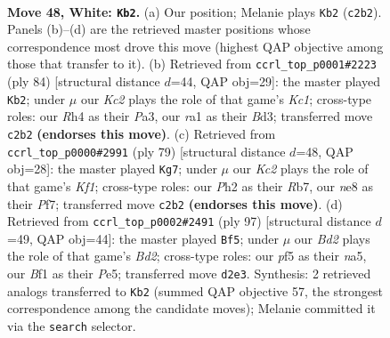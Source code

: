 \documentclass[11pt]{article}
\begin{document}
\clearpage

\begin{figure}[p]\centering
\begin{subfigure}{0.46\textwidth}\centering
\resizebox{\linewidth}{!}{%
\newchessgame
\chessboard[
  setfen={4n3/p1p5/2k5/5p2/r4P1R/8/2KB3P/r4BR1 w - - 0 48},
  showmover=false,
  pgfstyle=straightmove, color=movearrow, markmove={c2-b2}
]}
\caption{}
\end{subfigure}\hfill
\begin{subfigure}{0.46\textwidth}\centering
\resizebox{\linewidth}{!}{%
\newchessgame
\chessboard[
  setfen={2r5/8/p3pk1P/1pr5/7R/P2B1P2/2P5/2K5 w - - 2 43},
  showmover=false,
  pgfstyle=straightmove, color=movearrow, markmove={c1-b2}
]}
\caption{}
\end{subfigure}
\\[4pt]
\begin{subfigure}{0.46\textwidth}\centering
\resizebox{\linewidth}{!}{%
\newchessgame
\chessboard[
  setfen={5k2/1r1b1p2/r7/3N4/p2RP3/R3KP2/8/8 b - - 16 40},
  showmover=false,
  pgfstyle=straightmove, color=movearrow, markmove={f8-g7}
]}
\caption{}
\end{subfigure}\hfill
\begin{subfigure}{0.46\textwidth}\centering
\resizebox{\linewidth}{!}{%
\newchessgame
\chessboard[
  setfen={8/3brpk1/8/N1R1p1r1/P3R3/4P3/2P5/5K2 b - - 0 49},
  showmover=false,
  pgfstyle=straightmove, color=movearrow, markmove={d7-f5}
]}
\caption{}
\end{subfigure}
\caption{\textbf{Move 48, White: \texttt{Kb2}.} (a) Our position; Melanie plays \texttt{Kb2} (\texttt{c2b2}). Panels (b)--(d) are the retrieved master positions whose correspondence most drove this move (highest QAP objective among those that transfer to it). (b) Retrieved from \texttt{ccrl\_top\_p0001\#2223} (ply 84) [structural distance $d$=44, QAP obj=29]: the master played \texttt{Kb2}; under $\mu$ our \emph{Kc2} plays the role of that game's \emph{Kc1}; cross-type roles: our \emph{R}h4 as their \emph{P}a3, our \emph{r}a1 as their \emph{B}d3; transferred move \texttt{c2b2} \textbf{(endorses this move)}. (c) Retrieved from \texttt{ccrl\_top\_p0000\#2991} (ply 79) [structural distance $d$=48, QAP obj=28]: the master played \texttt{Kg7}; under $\mu$ our \emph{Kc2} plays the role of that game's \emph{Kf1}; cross-type roles: our \emph{P}h2 as their \emph{R}b7, our \emph{n}e8 as their \emph{P}f7; transferred move \texttt{c2b2} \textbf{(endorses this move)}. (d) Retrieved from \texttt{ccrl\_top\_p0002\#2491} (ply 97) [structural distance $d$=49, QAP obj=44]: the master played \texttt{Bf5}; under $\mu$ our \emph{Bd2} plays the role of that game's \emph{Bd2}; cross-type roles: our \emph{p}f5 as their \emph{n}a5, our \emph{B}f1 as their \emph{P}e5; transferred move \texttt{d2e3}. Synthesis: 2 retrieved analogs transferred to \texttt{Kb2} (summed QAP objective 57, the strongest correspondence among the candidate moves); Melanie committed it via the \texttt{search} selector.}
\label{fig:thought-m94}
\end{figure}
\end{document}
